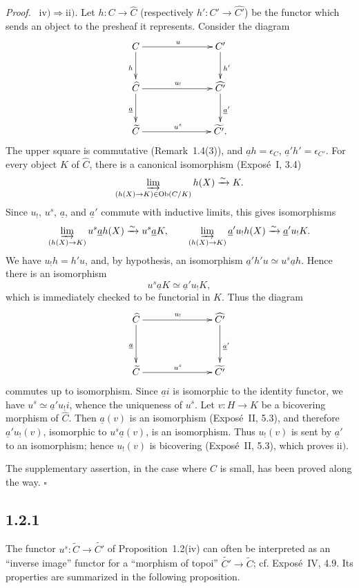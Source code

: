 \documentclass[11pt]{article}
\newcommand{\Ob}{\operatorname{Ob}}
\newcommand{\qedtext}{\hfill\(\square\)}
\newenvironment{prooftext}{\par\noindent\emph{Proof.}\ }{\par\medskip}
\begin{document}
\begin{prooftext}
\emph{\(\mathrm{iv)}\Rightarrow\mathrm{ii)}\).} Let \(h:C\to\widehat C\) (respectively \(h':C'\to\widehat{C'}\)) be the functor which sends an object to the presheaf it represents. Consider the diagram
\[
\xymatrix@C=2.5cm@R=1cm{
C \ar[r]^{u}\ar[d]_{h} & C'\ar[d]^{h'}\\
\widehat C \ar[r]^{u_!}\ar[d]_{\underline a}& \widehat{C'}\ar[d]^{\underline a'}\\
\widetilde C \ar[r]^{u^s}& \widetilde{C'}.
}
\]
The upper square is commutative (Remark~1.4(3)), and \(\underline a h=\epsilon_C\), \(\underline a'h'=\epsilon_{C'}\). For every object \(K\) of \(\widehat C\), there is a canonical isomorphism (Expos\'e~I, 3.4)
\[
\varinjlim_{(h(X)\to K)\in\Ob(C/K)}h(X)\xrightarrow{\sim}K.
\]
Since \(u_!\), \(u^s\), \(\underline a\), and \(\underline a'\) commute with inductive limits, this gives isomorphisms
\[
\varinjlim_{(h(X)\to K)}u^s\underline a h(X)\xrightarrow{\sim}u^s\underline a K,
\qquad
\varinjlim_{(h(X)\to K)}\underline a'u_!h(X)\xrightarrow{\sim}\underline a'u_!K.
\]
We have \(u_!h=h'u\), and, by hypothesis, an isomorphism \(\underline a'h'u\simeq u^s\underline a h\). Hence there is an isomorphism
\[
u^s\underline a K\simeq \underline a'u_!K,
\]
which is immediately checked to be functorial in \(K\). Thus the diagram
\[
\xymatrix@C=2.5cm@R=1.35cm{
\widehat C \ar[r]^{u_!}\ar[d]_{\underline a}& \widehat{C'}\ar[d]^{\underline a'}\\
\widetilde C \ar[r]^{u^s}& \widetilde{C'}
}
\]
commutes up to isomorphism. Since \(\underline a i\) is isomorphic to the identity functor, we have \(u^s\simeq\underline a'u_!i\), whence the uniqueness of \(u^s\). Let \(v:H\to K\) be a bicov\-ering morphism of \(\widehat C\). Then \(\underline a(v)\) is an isomorphism (Expos\'e~II, 5.3), and therefore \(\underline a'u_!(v)\), isomorphic to \(u^s\underline a(v)\), is an isomorphism. Thus \(u_!(v)\) is sent by \(\underline a'\) to an isomorphism; hence \(u_!(v)\) is bicov\-ering (Expos\'e~II, 5.3), which proves \(\mathrm{ii)}\).
\end{prooftext}

The supplementary assertion, in the case where \(C\) is small, has been proved along the way. \qedtext

\subsection*{1.2.1}
The functor \(u^s:\widetilde C\to\widetilde{C'}\) of Proposition~1.2(iv) can often be interpreted as an ``inverse image'' functor for a ``morphism of topoi'' \(\widetilde{C'}\to\widetilde C\); cf. Expos\'e~IV, 4.9. Its properties are summarized in the following proposition.
\end{document}
